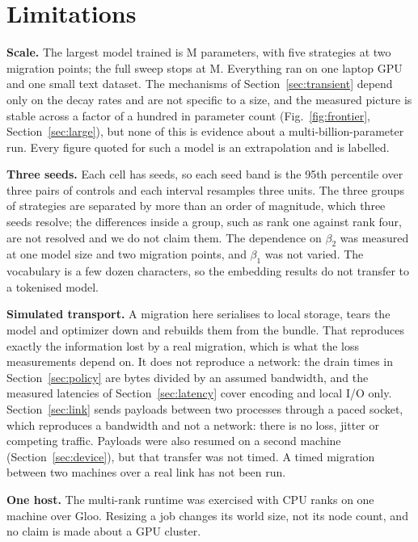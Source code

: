 \section{Limitations}
\label{sec:limits}

\textbf{Scale.} The largest model trained is \largeParams{}M parameters, with five strategies at two migration points;
the full sweep stops at \paramsM{}M. Everything ran on one laptop GPU and one small text dataset. The
mechanisms of Section~\ref{sec:transient} depend only on the decay rates and are not specific to a size, and the
measured picture is stable across a factor of a hundred in parameter count (Fig.~\ref{fig:frontier},
Section~\ref{sec:large}), but none of this
is evidence about a multi-billion-parameter run. Every figure quoted for such a model is an extrapolation and is
labelled.

\textbf{Three seeds.} Each cell has \nSeedsMax{} seeds, so each seed band is the 95th percentile over three pairs of
controls and each interval resamples three units. The three groups of strategies are separated by more than an order
of magnitude, which three seeds resolve; the differences inside a group, such as rank one against rank four, are not
resolved and we do not claim them. The dependence on $\beta_2$ was measured at one model size and two migration
points, and $\beta_1$ was not varied. The vocabulary is a few dozen characters, so the embedding results do not transfer to a
tokenised model.

\textbf{Simulated transport.} A migration here serialises to local storage, tears the model and optimizer down and
rebuilds them from the bundle. That reproduces exactly the information lost by a real migration, which is what the
loss measurements depend on. It does not reproduce a network: the drain times in Section~\ref{sec:policy} are bytes
divided by an assumed bandwidth, and the measured latencies of Section~\ref{sec:latency} cover encoding and local I/O
only. Section~\ref{sec:link} sends payloads between two processes through a paced socket, which reproduces a
bandwidth and not a network: there is no loss, jitter or competing traffic. Payloads were also resumed on a second
machine (Section~\ref{sec:device}), but that transfer was not timed. A timed migration between two machines over a real
link has not been run.

\textbf{One host.} The multi-rank runtime was exercised with CPU ranks on one machine over Gloo. Resizing a job changes
its world size, not its node count, and no claim is made about a GPU cluster.

